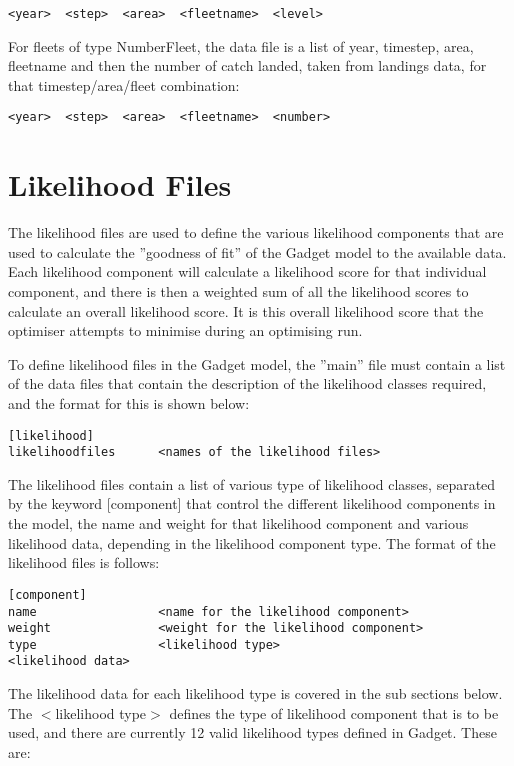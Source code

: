 \documentclass[10pt,twoside]{book}
\begin{document}
{\small\begin{verbatim}
<year>  <step>  <area>  <fleetname>  <level>
\end{verbatim}}

For fleets of type NumberFleet, the data file is a list of year, timestep, area, fleetname and then the number of catch landed, taken from landings data, for that timestep/area/fleet combination:

{\small\begin{verbatim}
<year>  <step>  <area>  <fleetname>  <number>
\end{verbatim}}

\chapter{Likelihood Files}\label{chap:like}
The likelihood files are used to define the various likelihood components that are used to calculate the ''goodness of fit'' of the Gadget model to the available data.  Each likelihood component will calculate a likelihood score for that individual component, and there is then a weighted sum of all the likelihood scores to calculate an overall likelihood score.  It is this overall likelihood score that the optimiser attempts to minimise during an optimising run.

\bigskip
To define likelihood files in the Gadget model, the ''main'' file must contain a list of the data files that contain the description of the likelihood classes required, and the format for this is shown below:

{\small\begin{verbatim}
[likelihood]
likelihoodfiles      <names of the likelihood files>
\end{verbatim}}

The likelihood files contain a list of various type of likelihood classes, separated by the keyword [component] that control the different likelihood components in the model, the name and weight for that likelihood component and various likelihood data, depending in the likelihood component type.  The format of the likelihood files is follows:

{\small\begin{verbatim}
[component]
name                 <name for the likelihood component>
weight               <weight for the likelihood component>
type                 <likelihood type>
<likelihood data>
\end{verbatim}}

The likelihood data for each likelihood type is covered in the sub sections below.  The $<$likelihood type$>$ defines the type of likelihood component that is to be used, and there are currently 12 valid likelihood types defined in Gadget.  These are:
\end{document}
